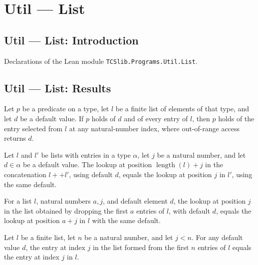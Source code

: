 \section{Util --- List}
\subsection*{Util --- List: Introduction}

Declarations of the Lean module \texttt{TCSlib.Programs.Util.List}.

\subsection*{Util --- List: Results}

\begin{theorem}
\label{List.getD_of_forall_mem}
\leanok
{}
Let $p$ be a predicate on a type, let $l$ be a finite list of elements of that type, and
let $d$ be a default value. If $p$ holds of $d$ and of every entry of $l$, then $p$
holds of the entry selected from $l$ at any natural-number index, where out-of-range
access returns $d$.
\end{theorem}

\begin{theorem}
\label{List.getD_append_add}
\leanok
{}
Let $l$ and $l'$ be lists with entries in a type $\alpha$, let $j$ be a natural number,
and let $d\in\alpha$ be a default value. The lookup at position
$\operatorname{length}(l)+j$ in the concatenation $l++l'$, using default $d$, equals the
lookup at position $j$ in $l'$, using the same default.
\end{theorem}

\begin{theorem}
\label{List.getD_drop}
\leanok
{}
For a list $l$, natural numbers $a,j$, and default element $d$, the lookup at position
$j$ in the list obtained by dropping the first $a$ entries of $l$, with default $d$,
equals the lookup at position $a+j$ in $l$ with the same default.
\end{theorem}

\begin{theorem}
\label{List.getD_take_of_lt}
\leanok
{}
Let $l$ be a finite list, let $n$ be a natural number, and let $j<n$. For any default
value $d$, the entry at index $j$ in the list formed from the first $n$ entries of $l$
equals the entry at index $j$ in $l$.
\end{theorem}

